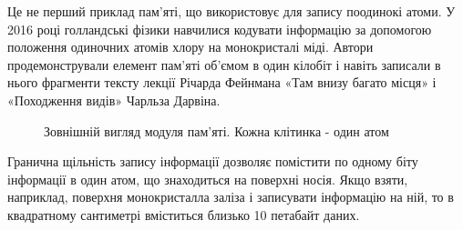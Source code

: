 \documentclass[a4paper,14pt]{extreport}
\begin{document}
Це не перший приклад пам'яті, що використовує для запису поодинокі атоми. У 2016 році голландські фізики навчилися кодувати інформацію за допомогою положення одиночних атомів хлору на монокристалі міді. Автори продемонстрували елемент пам'яті об'ємом в один кілобіт і навіть записали в нього фрагменти тексту лекції Річарда Фейнмана «Там внизу багато місця» і «Походження видів» Чарльза Дарвіна.\par

\begin{figure}[h]
  \caption{Зовнішній вигляд модуля пам'яті. Кожна клітинка - один атом}
  \label{ris8}
\end{figure}

Гранична щільність запису інформації дозволяє помістити по одному біту інформації в один атом, що знаходиться на поверхні носія. Якщо взяти, наприклад, поверхня монокристалла заліза і записувати інформацію на ній, то в квадратному сантиметрі вміститься близько 10 петабайт даних.\par
\end{document}
